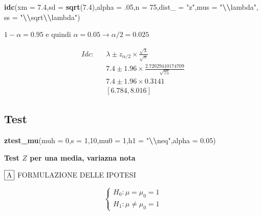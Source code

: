 \documentclass[
  11pt,
]{book}
\newenvironment{Shaded}{\begin{snugshade}}{\end{snugshade}}
\newcommand{\AttributeTok}[1]{\textcolor[rgb]{0.13,0.29,0.53}{#1}}
\newcommand{\DecValTok}[1]{\textcolor[rgb]{0.00,0.00,0.81}{#1}}
\newcommand{\FloatTok}[1]{\textcolor[rgb]{0.00,0.00,0.81}{#1}}
\newcommand{\FunctionTok}[1]{\textcolor[rgb]{0.13,0.29,0.53}{\textbf{#1}}}
\newcommand{\NormalTok}[1]{#1}
\newcommand{\SpecialCharTok}[1]{\textcolor[rgb]{0.81,0.36,0.00}{\textbf{#1}}}
\newcommand{\StringTok}[1]{\textcolor[rgb]{0.31,0.60,0.02}{#1}}
\theoremstyle{mytheoremstyle}
\theoremstyle{mydefstyle}
\begin{document}
\begin{Shaded}
\begin{Highlighting}[]
\FunctionTok{idc}\NormalTok{(}\AttributeTok{xm =} \FloatTok{7.4}\NormalTok{,}\AttributeTok{sd =} \FunctionTok{sqrt}\NormalTok{(}\FloatTok{7.4}\NormalTok{),}\AttributeTok{alpha =}\NormalTok{ .}\DecValTok{05}\NormalTok{,}\AttributeTok{n =} \DecValTok{75}\NormalTok{,}\AttributeTok{dist\_ =} \StringTok{"z"}\NormalTok{,}\AttributeTok{mus =} \StringTok{"}\SpecialCharTok{\textbackslash{}\textbackslash{}}\StringTok{lambda"}\NormalTok{,}
        \AttributeTok{ss =} \StringTok{"}\SpecialCharTok{\textbackslash{}\textbackslash{}}\StringTok{sqrt}\SpecialCharTok{\textbackslash{}\textbackslash{}}\StringTok{lambda"}\NormalTok{)}
\end{Highlighting}
\end{Shaded}

\(1-\alpha =0.95\) e quindi \(\alpha=0.05\rightarrow \alpha/2=0.025\)

\begin{eqnarray*}
  Idc: & &  \lambda \pm  z_{\alpha/2} \times \frac{ \sqrt\lambda }{\sqrt{n}} \\
     & &  7.4 \pm  1.96 \times \frac{ 2.72029410174709 }{\sqrt{ 75 }} \\
     & &  7.4 \pm  1.96 \times  0.3141 \\
     & & [ 6.784 ,  8.016 ]
\end{eqnarray*}

\subsection{Test}\label{test}

\begin{Shaded}
\begin{Highlighting}[]
\FunctionTok{ztest\_mu}\NormalTok{(}\AttributeTok{muh =} \DecValTok{0}\NormalTok{,}\AttributeTok{s =} \DecValTok{1}\NormalTok{,}\DecValTok{10}\NormalTok{,}\AttributeTok{mu0 =} \DecValTok{1}\NormalTok{,}\AttributeTok{h1 =} \StringTok{"}\SpecialCharTok{\textbackslash{}\textbackslash{}}\StringTok{neq"}\NormalTok{,}\AttributeTok{alpha =} \FloatTok{0.05}\NormalTok{)}
\end{Highlighting}
\end{Shaded}

\textbf{Test \(Z\) per una media, variazna nota}

\(\fbox{A}\) FORMULAZIONE DELLE IPOTESI

\[\begin{cases}
   H_0: \mu = \mu_0=1 \\
   H_1: \mu \neq \mu_0=1 
   \end{cases}\]
\end{document}
